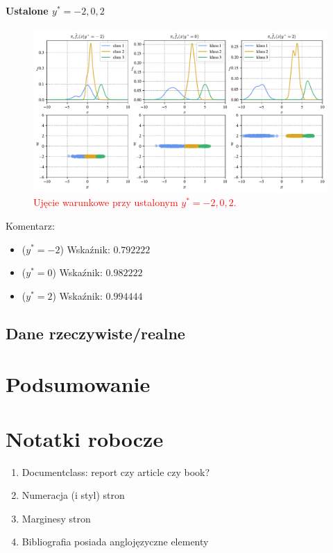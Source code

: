 \documentclass[12pt,a4paper,oneside]{book}
\theoremstyle{definition}
\begin{document}
\newpage
\subsubsection*{Ustalone $y^*=-2,0,2$}

\begin{figure}[H]
    \centering
    \includegraphics[scale=0.6]{synthetic_data_classification_ckde_extra}
    \vspace{-0.5cm} 
    \caption{\textcolor{red}{Ujęcie warunkowe przy ustalonym $y^*=-2,0,2$.}}
    \label{fig:synthetic_data_classification_ckde_extra}
\end{figure}
Komentarz:
\begin{itemize}
\item ($y^*=-2$) Wskaźnik: $0.792222$
\item ($y^*=0$) Wskaźnik: $0.982222$
\item ($y^*=2$) Wskaźnik: $0.994444$
\end{itemize}

\newpage
\section{Dane rzeczywiste/realne}

\chapter{Podsumowanie}

\chapter{Notatki robocze}

\begin{enumerate}
\item Documentclass: report czy article czy book?
\item Numeracja (i styl) stron
\item Marginesy stron
\item Bibliografia posiada anglojęzyczne elementy
\end{enumerate}
\end{document}
